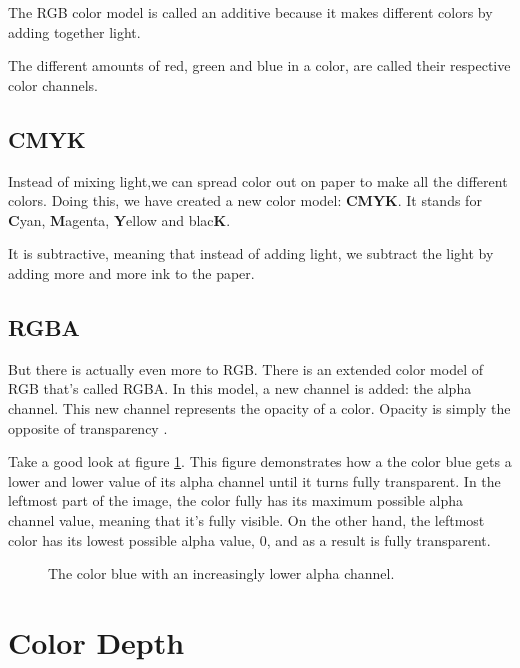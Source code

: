 \begin{refsection}
  The RGB color model is called an additive
  because it makes different colors by adding together light.

  The different amounts of red, green and blue in a color, are called
  their respective color channels.

  \subsection{CMYK}
  \label{sec:cmyk}

  Instead of mixing light,we can spread color out on paper to make all
  the different colors. Doing this, we have created a new color model:
  \textbf{CMYK}. It stands for \textbf{C}yan,
  \textbf{M}agenta, \textbf{Y}ellow and blac\textbf{K}.

  It is subtractive, meaning that
  instead of adding light, we subtract the light by adding more and
  more ink to the paper.

  \subsection{RGBA}

  But there is actually even more to RGB. There is an extended color
  model of RGB that's called RGBA. In this model, a new channel is
  added: the alpha channel. This new channel
  represents the opacity of a color. Opacity is simply the opposite of
  transparency \cite{porter84_compos_dig_img}.

  Take a good look at figure \ref{fig:alpha}. This figure demonstrates
  how a the color blue gets a lower and lower value of its alpha
  channel until it turns fully transparent. In the leftmost part of
  the image, the color fully has its maximum possible alpha channel
  value, meaning that it's fully visible. On the other hand, the
  leftmost color has its lowest possible alpha value, $0$, and as a
  result is fully transparent.

  \begin{figure}
    \centering
    \caption{The color blue with an increasingly lower alpha channel.}
    \label{fig:alpha}
  \end{figure}

  \section{Color Depth}
  \label{sec:color-depth}


\end{refsection}
